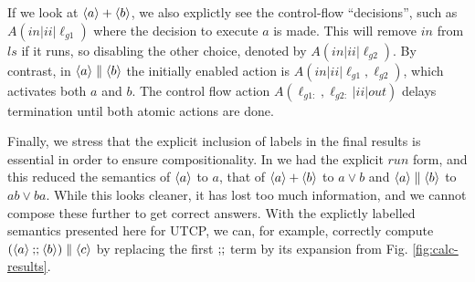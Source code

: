 If we look at $\langle a\rangle + \langle b\rangle$, we also explictly
see the control-flow ``decisions'',
such as $A(in|ii|\ell_{g1})$ where the decision to execute $a$ is made.
This will remove $in$ from $ls$ if it runs,
so disabling the other choice, denoted by $A(in|ii|\ell_{g2})$.
By contrast, in $\langle a\rangle\parallel \langle b\rangle$ the initially enabled
action is $A(in|ii|\ell_{g1},\ell_{g2})$, which activates both $a$ and $b$.
The control flow action $A(\ell_{g1:},\ell_{g2:}|ii|out)$ delays termination
until both atomic actions are done.

Finally,
we stress that the explicit inclusion of labels in the final results
is essential in order to ensure compositionality.
In \cite{conf/tase/BMN16} we had the explicit $run$ form,
and this reduced the semantics of $\langle a\rangle$ to $a$,
that of $\langle a\rangle + \langle b\rangle$ to $a \lor b$
and $\langle a\rangle \parallel \langle b\rangle$ to $ab\lor ba$.
While this looks cleaner, it has lost too much information,
and we cannot compose these further to get correct answers.
With the explictly labelled semantics presented here for UTCP,
we can, for example, correctly compute $(\langle a\rangle \mathbin{;\!;} \langle b\rangle) \parallel \langle c\rangle$
by replacing the first $\mathbin{;\!;}$ term by its expansion
from Fig. \ref{fig:calc-results}.
